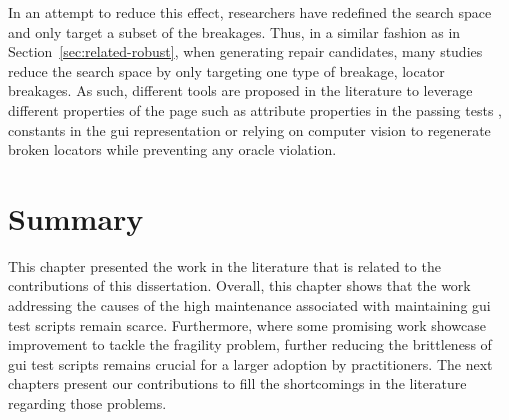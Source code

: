 In an attempt to reduce this effect, researchers have redefined the search space and only target a subset of the breakages. Thus, in a similar fashion as in Section~\ref{sec:related-robust}, when generating repair candidates, many studies reduce the search space by only targeting one type of breakage, locator breakages. As such, different tools are proposed in the literature to leverage different properties of the page such as attribute properties in the passing tests \cite{Choudhary2011}, constants in the \gls{gui} representation \cite{Eladawy2018, Kirinuki2019} or relying on computer vision\cite{Stocco2018} to regenerate broken locators while preventing any oracle violation.

\section{Summary}
\label{sec:related-summary}

This chapter presented the work in the literature that is related to the contributions of this dissertation. Overall, this chapter shows that the work addressing the causes of the high maintenance associated with maintaining \gls{gui} test scripts remain scarce. Furthermore, where some promising work showcase improvement to tackle the fragility problem, further reducing the brittleness of \gls{gui} test scripts remains crucial for a larger adoption by practitioners. The next chapters present our contributions to fill the shortcomings in the literature regarding those problems.